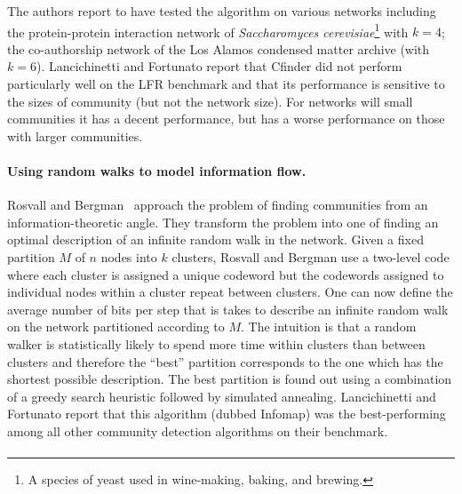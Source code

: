 The authors report to have tested the algorithm on various networks including the protein-protein interaction 
network of \emph{Saccharomyces cerevisiae}\footnote{A species of yeast used in wine-making, baking, and brewing.} 
with $k = 4$; the co-authorship network of the Los Alamos condensed matter archive (with $k = 6$). 
Lancichinetti and Fortunato report that Cfinder did not perform particularly well on the LFR benchmark and 
that its performance is sensitive to the sizes of community (but not the network size). For networks will 
small communities it has a decent performance, but has a worse performance on those with larger communities. 

\paragraph{Using random walks to model information flow.} Rosvall and Bergman~\cite{RB08} approach the 
problem of finding communities from an information-theoretic angle. They transform the problem 
into one of finding an optimal description of an infinite random walk in the network.  Given a fixed 
partition $M$ of $n$ nodes into $k$ clusters, Rosvall and Bergman use a two-level code where each 
cluster is assigned a unique codeword but the codewords assigned to individual nodes within a 
cluster repeat between clusters. One can now define the average number of bits per step that is 
takes to describe an infinite random walk on the network partitioned according to $M$. The intuition 
is that a random walker is statistically likely to spend more time within clusters than between clusters
and therefore the ``best'' partition corresponds to the one which has the shortest possible description.
The best partition is found out using a combination of a greedy search heuristic followed by simulated 
annealing. Lancichinetti and Fortunato report that this algorithm (dubbed Infomap) was the best-performing 
among all other community detection algorithms on their benchmark.  

\paragraph{}

